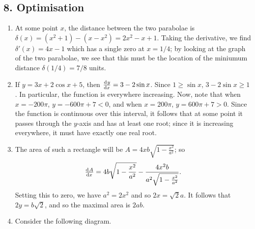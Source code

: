 \subsection*{8. Optimisation}
\begin{enumerate}
  \item At some point $ x $, the distance between the two parabolae is $ \delta(x) = (x^2 + 1) - (x - x^2) = 2x^2 - x + 1 $. Taking
        the derivative, we find $ \delta'(x) = 4x - 1 $ which has a single zero at $ x = 1/4 $; by looking at the graph of the two
        parabolae, we see that this must be the location of the miniumum distance $ \delta(1/4) = 7/8 $ units.
  \item If $ y = 3x + 2\cos x + 5 $, then $ \od{y}{x} = 3 -2\sin x $. Since $ 1 \geq \sin x $, $ 3 - 2\sin x \geq 1 $. In particular,
        the function is everywhere increasing. Now, note that when $ x = -200\pi $, $ y = -600\pi + 7 < 0 $, and when $ x = 200\pi $,
        $ y = 600\pi + 7 > 0 $. Since the function is continuous over this interval, it follows that at some point it passes through
        the $ y$-axis and has at least one root; since it is increasing everywhere, it must have exactly one real root.
  \item The area of such a rectangle will be $ A = 4x b\sqrt{1 - \frac{x^2}{a^2}} $; so
        \begin{displaymath}
          \od{A}{x} = 4b\sqrt{1 - \frac{x^2}{a^2}} - \frac{4x^2b}{a^2\sqrt{1 - \frac{x^2}{a^2}}}.
        \end{displaymath}
        Setting this to zero, we have $ a^2 = 2x^2 $ and so $ 2x = \sqrt{2}a $. It follows that $ 2y = b\sqrt{2} $, and so the maximal
        area is $ 2ab $.
  \item Consider the following diagram.
        \begin{center}
\end{center}
\end{enumerate}
